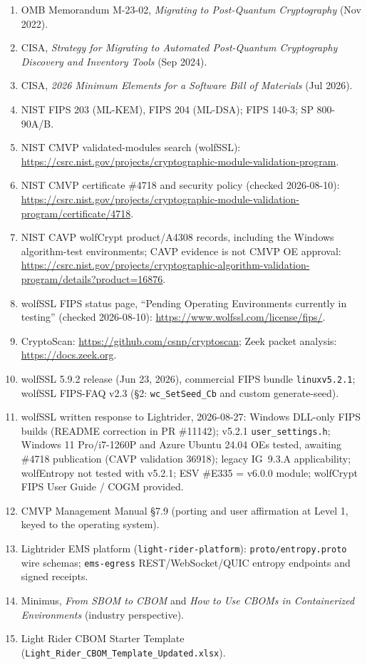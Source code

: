 \documentclass[10pt]{article}
\newcommand{\code}[1]{\texttt{\small #1}}
\begin{document}
\begin{small}
\begin{enumerate}
  \item OMB Memorandum M-23-02, \emph{Migrating to Post-Quantum Cryptography} (Nov 2022).
  \item CISA, \emph{Strategy for Migrating to Automated Post-Quantum Cryptography
        Discovery and Inventory Tools} (Sep 2024).
  \item CISA, \emph{2026 Minimum Elements for a Software Bill of Materials} (Jul 2026).
  \item NIST FIPS 203 (ML-KEM), FIPS 204 (ML-DSA); FIPS 140-3; SP 800-90A/B.
  \item NIST CMVP validated-modules search (wolfSSL):\\
        \url{https://csrc.nist.gov/projects/cryptographic-module-validation-program}.
  \item NIST CMVP certificate \#4718 and security policy (checked 2026-08-10):\\
        \url{https://csrc.nist.gov/projects/cryptographic-module-validation-program/certificate/4718}.
  \item NIST CAVP wolfCrypt product/A4308 records, including the Windows algorithm-test
        environments; CAVP evidence is not CMVP OE approval:\\
        \url{https://csrc.nist.gov/projects/cryptographic-algorithm-validation-program/details?product=16876}.
  \item wolfSSL FIPS status page, ``Pending Operating Environments currently in testing''
        (checked 2026-08-10): \url{https://www.wolfssl.com/license/fips/}.
  \item CryptoScan: \url{https://github.com/csnp/cryptoscan}; Zeek packet analysis:
        \url{https://docs.zeek.org}.
  \item wolfSSL 5.9.2 release (Jun 23, 2026), commercial FIPS bundle
        \code{linuxv5.2.1}; wolfSSL FIPS-FAQ v2.3 (\S2: \code{wc\_SetSeed\_Cb} and
        custom generate-seed).
  \item wolfSSL written response to Lightrider, 2026-08-27: Windows DLL-only FIPS builds
        (README correction in PR \#11142); v5.2.1 \code{user\_settings.h}; Windows 11
        Pro/i7-1260P and Azure Ubuntu 24.04 OEs tested, awaiting \#4718 publication
        (CAVP validation 36918); legacy IG~9.3.A applicability; wolfEntropy not tested
        with v5.2.1; ESV \#E335 = v6.0.0 module; wolfCrypt FIPS User Guide / COGM
        provided.
  \item CMVP Management Manual \S7.9 (porting and user affirmation at Level 1, keyed to
        the operating system).
  \item Lightrider EMS platform (\code{light-rider-platform}): \code{proto/entropy.proto}
        wire schemas; \code{ems-egress} REST/WebSocket/QUIC entropy endpoints and signed
        receipts.
  \item Minimus, \emph{From SBOM to CBOM} and \emph{How to Use CBOMs in Containerized
        Environments} (industry perspective).
  \item Light Rider CBOM Starter Template (\code{Light\_Rider\_CBOM\_Template\_Updated.xlsx}).
\end{enumerate}
\end{small}
\end{document}
